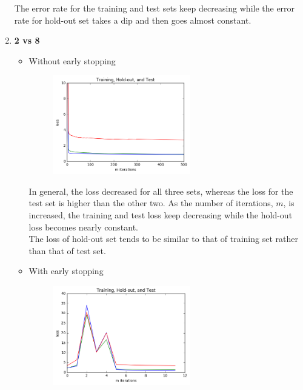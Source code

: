 \documentclass[11pt,twoside]{article}
\begin{document}
\begin{enumerate}[label=(\alph*)]
  The error rate for the training and test sets keep decreasing while the error rate for hold-out set takes a dip and then goes almost constant.\\

\item \textbf{2 vs 8}

\begin{itemize}
  \item Without early stopping
  
  \begin{figure}[H]
  \includegraphics[width=0.6\textwidth]{cnonstop_all_loss}
  \centering
  \caption{}
  \label{fig:4_2}
  \end{figure}
  
  In general, the loss decreased for all three sets, whereas the loss for the test set is higher than the other two. As the number of iterations, $m$, is increased, the training and test loss keep decreasing while the hold-out loss becomes nearly constant.\\
  
  The loss of hold-out set tends to be similar to that of training set rather than that of test set.\\
  
  \item With early stopping
 
  \begin{figure}[H]
  \includegraphics[width=0.6\textwidth]{cstop_all_loss}
  \centering
  \caption{}
  \label{fig:4_2}
  \end{figure}
  

\end{itemize}
\end{enumerate}
\end{document}
